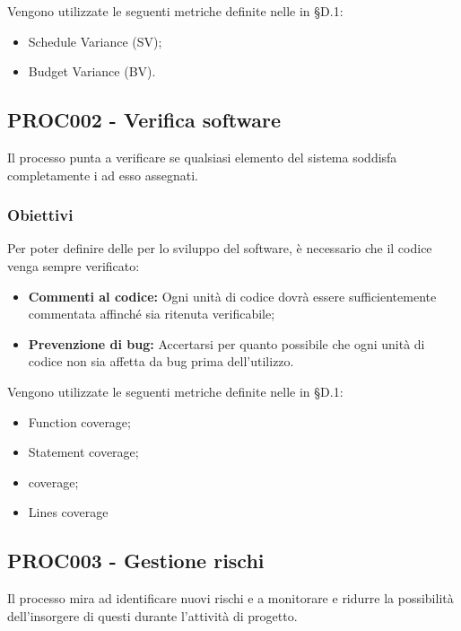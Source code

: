 \documentclass[PianoDiQualifica.tex]{subfiles}
\begin{document}
Vengono utilizzate le seguenti metriche definite nelle \ndp in \S{D.1}:
\begin{itemize}
	\item {} Schedule Variance (SV);
	\item {} Budget Variance (BV).
\end{itemize}

\subsection{PROC002 - Verifica software}
Il processo punta a verificare se qualsiasi elemento del sistema soddisfa completamente i  ad esso assegnati.
\subsubsection{Obiettivi}
Per poter definire delle  per lo sviluppo del software, è necessario che il codice venga sempre verificato:
\begin{itemize}
	\item \textbf{Commenti al codice:} Ogni unità di codice dovrà essere sufficientemente commentata affinché sia ritenuta verificabile;
	\item \textbf{Prevenzione di bug:} Accertarsi per quanto possibile che ogni unità di codice non sia affetta da bug prima dell'utilizzo.
\end{itemize}
Vengono utilizzate le seguenti metriche definite nelle \ndp in \S{D.1}:
\begin{itemize}
	\item {} Function coverage;
	\item {} Statement coverage;
	\item {}  coverage;
	\item {} Lines coverage
\end{itemize}

	\subsection{PROC003 - Gestione rischi}
Il processo mira ad identificare nuovi rischi e a monitorare e ridurre la possibilità dell'insorgere di questi durante l'attività di progetto.
\end{document}
